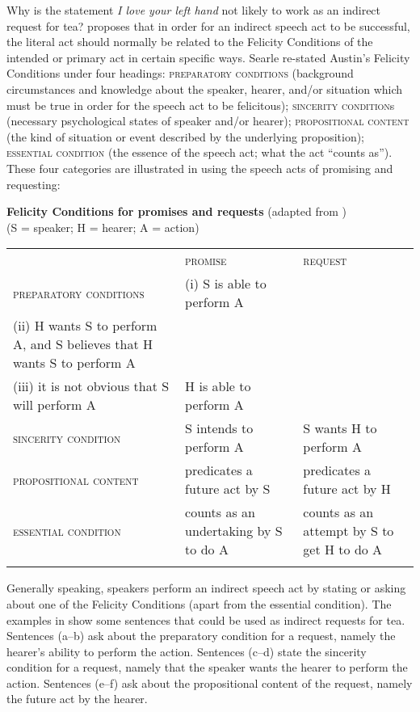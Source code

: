Why is the statement \textit{I love your left hand} not likely to work as an indirect request for tea? \citet{Searle1969,Searle1975} proposes that in order for an indirect speech act to be successful, the literal act should normally be related to the Felicity Conditions of the intended or primary act in certain specific ways. Searle re-stated Austin’s Felicity Conditions under four headings: \textsc{preparatory conditions} (background circumstances and knowledge about the speaker, hearer, and/or situation which must be true in order for the speech act to be felicitous); \textsc{sincerity condition}s (necessary psychological states of speaker and/or hearer); \textsc{propositional content} (the kind of situation or event described by the underlying proposition); \textsc{essential condition} (the essence of the speech act; what the act “counts as”). These four categories are illustrated in  using the speech acts of promising and requesting:


\ea \label{ex:10.7}
\textbf{Felicity Conditions for promises and requests} (adapted from \citealt{Searle1969,Searle1975})\\
(S = speaker; H = hearer; A = action)
\begin{tabularx}{\textwidth}{XXX} & \scshape promise & \scshape request\\
\lsptoprule
\scshape preparatory conditions & (i) S is able to perform A\\
(ii) H wants S to perform A, and S believes that H wants S to perform A\\
(iii) it is not obvious that S will perform A & H is able to perform A\\
\scshape sincerity condition & S intends to perform A & S wants H to perform A\\
\scshape propositional content & predicates a future act by S & predicates a future act by H\\
\scshape essential condition & counts as an undertaking by S to do A & counts as an attempt by S to get H to do A\\
\lspbottomrule
\end{tabularx}
\z

Generally speaking, speakers perform an indirect speech act by stating or asking about one of the Felicity Conditions (apart from the essential condition). The examples in  show some sentences that could be used as indirect requests for tea. Sentences (a--b) ask about the preparatory condition for a request, namely the hearer’s ability to perform the action. Sentences (c--d) state the sincerity condition for a request, namely that the speaker wants the hearer to perform the action. Sentences (e--f) ask about the propositional content of the request, namely the future act by the hearer.


